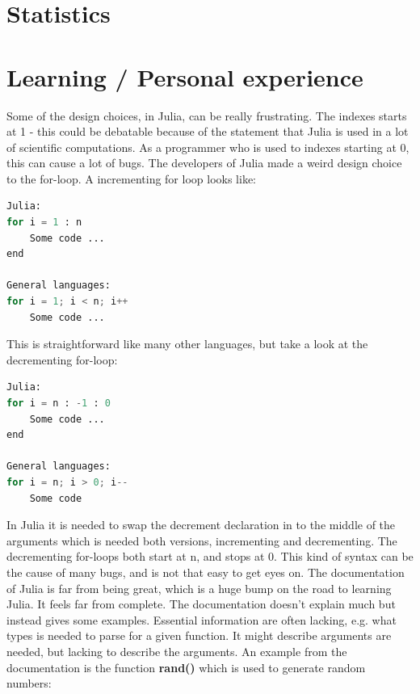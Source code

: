 \documentclass[a4paper,11pt]{article}
\begin{document}
\section{Statistics}

\section{Learning / Personal experience}
Some of the design choices, in Julia, can be really frustrating. The indexes starts at 1 - this could be debatable because of the statement that Julia is used in a lot of scientific computations. As a programmer who is used to indexes starting at 0, this can cause a lot of bugs. The developers of Julia made a weird design choice to the for-loop. A incrementing for loop looks like:
\begin{lstlisting}[language=python]
Julia:
for i = 1 : n
	Some code ...
end

General languages:
for i = 1; i < n; i++
	Some code ...
\end{lstlisting}
This is straightforward like many other languages, but take a look at the decrementing for-loop:
\begin{lstlisting}[language=python]
Julia:
for i = n : -1 : 0
	Some code ...
end

General languages:
for i = n; i > 0; i--
	Some code
\end{lstlisting}
In Julia it is needed to swap the decrement declaration in to the middle of the arguments which is needed both versions, incrementing and decrementing. The decrementing for-loops both start at n, and stops at 0. This kind of syntax can be the cause of many bugs, and is not that easy to get eyes on.
The documentation of Julia is far from being great, which is a huge bump on the road to learning Julia. It feels far from complete. The documentation doesn’t explain much but instead gives some examples. Essential information are often lacking, e.g. what types is needed to parse for a given function. It might describe arguments are needed, but lacking to describe the arguments. An example from the documentation is the function \textbf{rand()} which is used to generate random numbers:
\end{document}
